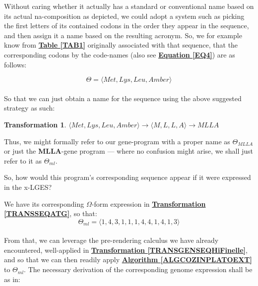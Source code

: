 \documentclass[a4paper, 18pt]{book} %
\newtheorem{trans}{Transformation}
\begin{document}
Without caring whether it actually has a standard or conventional name based on its actual na-composition as depicted, we could adopt a system such as picking the first letters of its contained codons in the order they appear in the sequence, and then assign it a name based on the resulting acronym. So, we for example know from \textbf{\hyperref[TAB1]{Table \ref{TAB1}}} originally associated with that sequence, that the corresponding codons  by the code-names (also see \textbf{\hyperref[EQ4]{Equation \ref{EQ4}}}) are as follows:

\begin{equation}
\Theta = \langle Met, Lys, Leu, Amber \rangle
\end{equation}\\

So that we can just obtain a name for the sequence using the above suggested strategy as such:

\begin{trans}
$\langle Met, Lys, Leu, Amber \rangle \rightarrow \langle M, L, L, A \rangle \rightarrow MLLA$
\end{trans}

Thus, we might formally refer to our gene-program with a proper name as $\Theta_{MLLA}$ or just the \textbf{MLLA}-gene program --- where no confusion might arise, we shall just refer to it as $\Theta_{ml}$. 

So, how would this program's corresponding sequence appear if it were expressed in the x-LGES?

We have its corresponding $\Omega$-form expression in \textbf{\hyperref[TRANSSEQATG]{Transformation \ref{TRANSSEQATG}}}, so that:\\

\begin{equation}
\label{EQSEQMLLA}
\Theta_{ml} = \langle  1, 4, 3, 1, 1, 1, 4, 4, 1, 4, 1, 3 \rangle
\end{equation}\\

From that, we can leverage the pre-rendering calculus we have already encountered, well-applied in \textbf{\hyperref[TRANSGENSEQHiFinelle]{Transformation \ref{TRANSGENSEQHiFinelle}}}, and so that we can then readily apply \textbf{\hyperref[ALGCOZINPLATOEXT]{Algorithm \ref{ALGCOZINPLATOEXT}}} to $\Theta_{ml}$. The necessary derivation of the corresponding genome expression shall be as in: 
\end{document}
